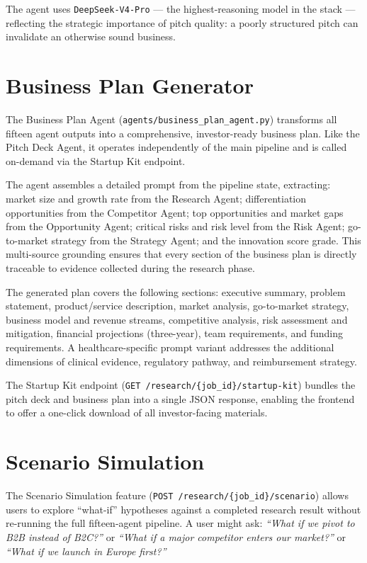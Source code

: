 \documentclass[12pt,a4paper,oneside]{book}
\begin{document}
The agent uses \texttt{DeepSeek-V4-Pro} — the highest-reasoning model in the stack —
reflecting the strategic importance of pitch quality: a poorly structured pitch can
invalidate an otherwise sound business.

\section{Business Plan Generator}
\label{sec:business_plan}

The Business Plan Agent (\texttt{agents/business\_plan\_agent.py}) transforms all
fifteen agent outputs into a comprehensive, investor-ready business plan. Like the
Pitch Deck Agent, it operates independently of the main pipeline and is called
on-demand via the Startup Kit endpoint.

The agent assembles a detailed prompt from the pipeline state, extracting:
market size and growth rate from the Research Agent; differentiation opportunities
from the Competitor Agent; top opportunities and market gaps from the Opportunity
Agent; critical risks and risk level from the Risk Agent; go-to-market strategy
from the Strategy Agent; and the innovation score grade. This multi-source grounding
ensures that every section of the business plan is directly traceable to evidence
collected during the research phase.

The generated plan covers the following sections: executive summary, problem
statement, product/service description, market analysis, go-to-market strategy,
business model and revenue streams, competitive analysis, risk assessment and
mitigation, financial projections (three-year), team requirements, and funding
requirements. A healthcare-specific prompt variant addresses the additional
dimensions of clinical evidence, regulatory pathway, and reimbursement strategy.

The Startup Kit endpoint (\texttt{GET /research/\{job\_id\}/startup-kit}) bundles the
pitch deck and business plan into a single JSON response, enabling the frontend to
offer a one-click download of all investor-facing materials.

\section{Scenario Simulation}
\label{sec:scenario}

The Scenario Simulation feature (\texttt{POST /research/\{job\_id\}/scenario}) allows
users to explore ``what-if'' hypotheses against a completed research result without
re-running the full fifteen-agent pipeline. A user might ask: \emph{``What if we
pivot to B2B instead of B2C?''} or \emph{``What if a major competitor enters our
market?''} or \emph{``What if we launch in Europe first?''}
\end{document}
